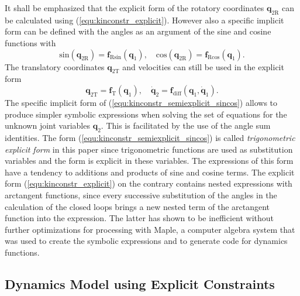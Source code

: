 \documentclass{svproc}
\newcommand{\bm}[1]{\boldsymbol{#1}}
\begin{document}
It shall be emphasized that the explicit form of the rotatory coordinates $\bm{q}_{2\mathrm{R}}$ can be calculated using (\ref{equ:kinconstr_explicit}).
However also a specific implicit form can be defined with the angles as an argument of the sine and cosine functions with
%
\begin{equation}
\mathrm{sin}(\bm{q}_{2\mathrm{R}}) = \bm{f}_{\mathrm{R}\mathrm{sin}}(\bm{q}_1),
\quad
\mathrm{cos}(\bm{q}_{2\mathrm{R}}) = \bm{f}_{\mathrm{R}\mathrm{cos}}(\bm{q}_1). \label{equ:kinconstr_semiexplicit_sincos}
\end{equation}
%
The translatory coordinates $\bm{q}_{2\mathrm{T}}$ and velocities can still be used in the explicit form
%
\vspace{-0.2cm}
\begin{equation}
\bm{q}_{2\mathrm{T}} = \bm{f}_{\mathrm{T}}(\bm{q}_{1}), 
\quad 
\dot{\bm{q}}_{2} = \bm{f}_{\mathrm{diff}}(\bm{q}_{1},\dot{\bm{q}}_{1}). \label{equ:kinconstr_semiexplicit_diff_transl}
\end{equation}
%
The specific implicit form of (\ref{equ:kinconstr_semiexplicit_sincos}) allows to produce simpler symbolic expressions when solving the set of equations for the unknown joint variables $\bm{q}_{2}$. 
This is facilitated by the use of the angle sum identities.
The form  (\ref{equ:kinconstr_semiexplicit_sincos}) is called \emph{trigonometric explicit form} in this paper since trigonometric functions are used as substitution variables and the form is explicit in these variables.
The expressions of this form have a tendency to additions and products of sine and cosine terms.
The explicit form (\ref{equ:kinconstr_explicit}) on the contrary contains nested expressions with arctangent functions, since every successive substitution of the angles in the calculation of the closed loops brings a new nested term of the arctangent function into the expression.
The latter has shown to be inefficient without further optimizations for processing with Maple, a computer algebra system that was used to create the symbolic expressions and to generate code for dynamics functions. %

\subsection{Dynamics Model using Explicit Constraints}
\label{sec:Lagrange2Elim}
\end{document}
